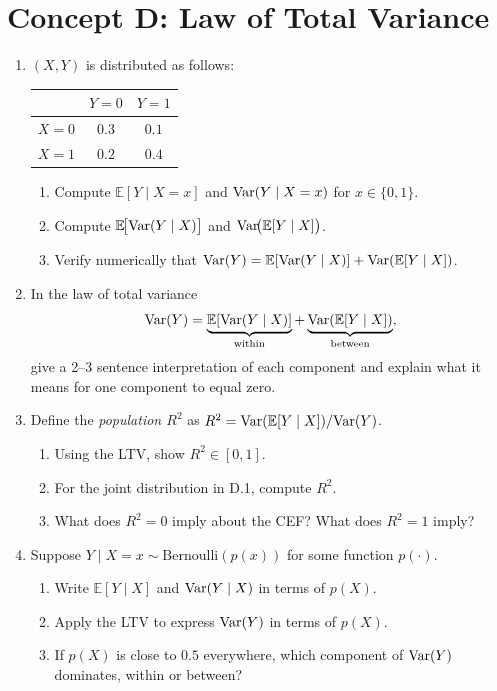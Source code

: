 \documentclass{article}
\newcommand{\E}{\mathbb{E}}
\begin{document}
\bigskip

\section*{Concept D: Law of Total Variance}

\begin{enumerate}[label=\textbf{D.\arabic*},leftmargin=*,itemsep=10pt]

\item $(X,Y)$ is distributed as follows:
\begin{center}
\begin{tabular}{c|cc}
      & $Y=0$ & $Y=1$ \\
\hline
$X=0$ & $0.3$ & $0.1$ \\
$X=1$ & $0.2$ & $0.4$
\end{tabular}
\end{center}
\begin{enumerate}[label=(\alph*)]
  \item Compute $\E[Y\mid X=x]$ and $\mbox{Var}(Y \mid X = x)$ for $x \in \{0,1\}$.
  \item Compute $\E\!\big[\Var(Y \mid X)\big]$ and $\Var\!\big(\E[Y \mid X]\big)$.
  \item Verify numerically that $\Var(Y) = \E[\Var(Y\mid X)] + \Var(\E[Y\mid X])$.
\end{enumerate}

\item In the law of total variance
$$\Var(Y) = \underbrace{\E[\Var(Y \mid X)]}_{\text{within}} + \underbrace{\Var(\E[Y \mid X])}_{\text{between}},$$
give a 2--3 sentence interpretation of each component and explain what it means for one component to equal zero.

\item Define the \emph{population $R^2$} as $R^2 = \Var(\E[Y\mid X])/\Var(Y)$.
\begin{enumerate}[label=(\alph*)]
  \item Using the LTV, show $R^2 \in [0, 1]$.
  \item For the joint distribution in D.1, compute $R^2$.
  \item What does $R^2 = 0$ imply about the CEF?  What does $R^2 = 1$ imply?
\end{enumerate}

\item Suppose $Y \mid X = x \sim \text{Bernoulli}(p(x))$ for some function $p(\cdot)$.
\begin{enumerate}[label=(\alph*)]
  \item Write $\E[Y \mid X]$ and $\mbox{Var}(Y\mid X)$ in terms of $p(X)$.
  \item Apply the LTV to express $\mbox{Var}(Y)$ in terms of $p(X)$.
  \item If $p(X)$ is close to $0.5$ everywhere, which component of $\mbox{Var}(Y)$ dominates, within or between?
\end{enumerate}


\end{enumerate}
\end{document}
